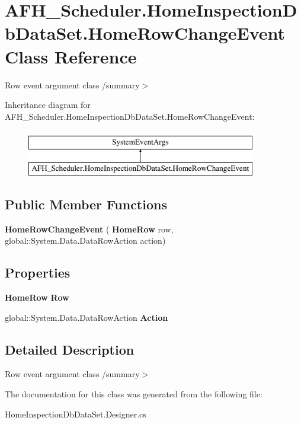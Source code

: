 \section{A\+F\+H\+\_\+\+Scheduler.\+Home\+Inspection\+Db\+Data\+Set.\+Home\+Row\+Change\+Event Class Reference}
\label{class_a_f_h___scheduler_1_1_home_inspection_db_data_set_1_1_home_row_change_event}


Row event argument class /summary$>$  


Inheritance diagram for A\+F\+H\+\_\+\+Scheduler.\+Home\+Inspection\+Db\+Data\+Set.\+Home\+Row\+Change\+Event\+:\begin{figure}[H]
\begin{center}
\leavevmode
\includegraphics[height=2.000000cm]{class_a_f_h___scheduler_1_1_home_inspection_db_data_set_1_1_home_row_change_event}
\end{center}
\end{figure}
\subsection*{Public Member Functions}
\begin{DoxyCompactItemize}
\item 
\mbox{\label{class_a_f_h___scheduler_1_1_home_inspection_db_data_set_1_1_home_row_change_event_aba2df0b894c3107fa717a794de2441a6}} 
{\bfseries Home\+Row\+Change\+Event} (\textbf{ Home\+Row} row, global\+::\+System.\+Data.\+Data\+Row\+Action action)
\end{DoxyCompactItemize}
\subsection*{Properties}
\begin{DoxyCompactItemize}
\item 
\mbox{\label{class_a_f_h___scheduler_1_1_home_inspection_db_data_set_1_1_home_row_change_event_a446c9779ea8fc3f97567666904038a2d}} 
\textbf{ Home\+Row} {\bfseries Row}\hspace{0.3cm}{\ttfamily  [get]}
\item 
\mbox{\label{class_a_f_h___scheduler_1_1_home_inspection_db_data_set_1_1_home_row_change_event_a4de3e399d95cf717ef3d30a5cd6e9162}} 
global\+::\+System.\+Data.\+Data\+Row\+Action {\bfseries Action}\hspace{0.3cm}{\ttfamily  [get]}
\end{DoxyCompactItemize}


\subsection{Detailed Description}
Row event argument class /summary$>$ 

The documentation for this class was generated from the following file\+:\begin{DoxyCompactItemize}
\item 
Home\+Inspection\+Db\+Data\+Set.\+Designer.\+cs\end{DoxyCompactItemize}
